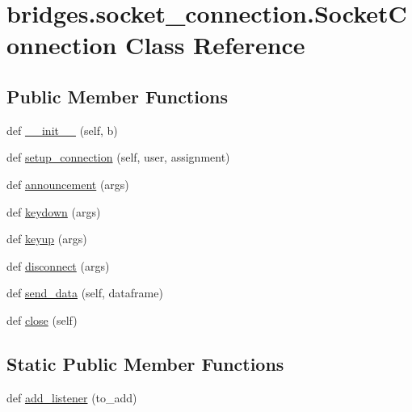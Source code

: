 \hypertarget{classbridges_1_1socket__connection_1_1_socket_connection}{}\section{bridges.\+socket\+\_\+connection.\+Socket\+Connection Class Reference}
\label{classbridges_1_1socket__connection_1_1_socket_connection}
\subsection*{Public Member Functions}
\begin{DoxyCompactItemize}
\item 
def \hyperlink{classbridges_1_1socket__connection_1_1_socket_connection_ae241a5233f4cb8ad07e9a716ebfa3e55}{\+\_\+\+\_\+init\+\_\+\+\_\+} (self, b)
\item 
def \hyperlink{classbridges_1_1socket__connection_1_1_socket_connection_a346d70ef1084f4387df0f3027ac0f527}{setup\+\_\+connection} (self, user, assignment)
\item 
def \hyperlink{classbridges_1_1socket__connection_1_1_socket_connection_ad2dbfe3f51475790ed1f03dc945168f1}{announcement} (args)
\item 
def \hyperlink{classbridges_1_1socket__connection_1_1_socket_connection_a6acd8ac3ac9d055de1ba086b447fbe7f}{keydown} (args)
\item 
def \hyperlink{classbridges_1_1socket__connection_1_1_socket_connection_a4ee952f67b32414fba663d5e9c53bf14}{keyup} (args)
\item 
def \hyperlink{classbridges_1_1socket__connection_1_1_socket_connection_a50b0181494d99f9a33bf7fb75c100842}{disconnect} (args)
\item 
def \hyperlink{classbridges_1_1socket__connection_1_1_socket_connection_a6f120b756e07aab0742ed42466984b31}{send\+\_\+data} (self, dataframe)
\item 
def \hyperlink{classbridges_1_1socket__connection_1_1_socket_connection_a38dd36c5ac674016d526e8cd2c515ac4}{close} (self)
\end{DoxyCompactItemize}
\subsection*{Static Public Member Functions}
\begin{DoxyCompactItemize}
\item 
def \hyperlink{classbridges_1_1socket__connection_1_1_socket_connection_a21d94eb97d7ea92e38dc8e78f1e40876}{add\+\_\+listener} (to\+\_\+add)
\end{DoxyCompactItemize}
